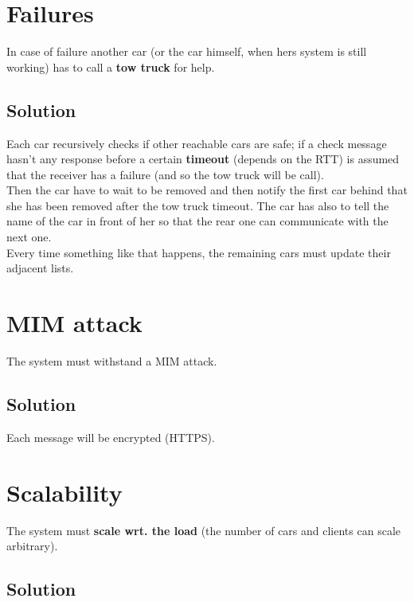 \section{Failures}

In case of failure another car (or the car himself, when hers system is still working)
 has to call a \textbf{tow truck} for help. 


\subsection{Solution}

Each car recursively checks if other reachable cars are safe; if a check message
hasn't any response before a certain \textbf{timeout} (depends on the RTT) is assumed 
that the receiver has a failure (and so the tow truck will be call).\\Then the car have to wait to be removed 
and then notify the first car behind that she has been removed after the tow truck timeout.
The car has also to tell the name of the car in front of her so that the rear one can communicate with the next one. \\
Every time something like that happens, the remaining cars must update their adjacent lists.



\section{MIM attack}

The system must withstand a MIM attack.


\subsection{Solution}

Each message will be encrypted (HTTPS).


\section{Scalability}

The system must \textbf{scale wrt. the load} 
(the number of cars and clients can scale arbitrary).


\subsection{Solution}

